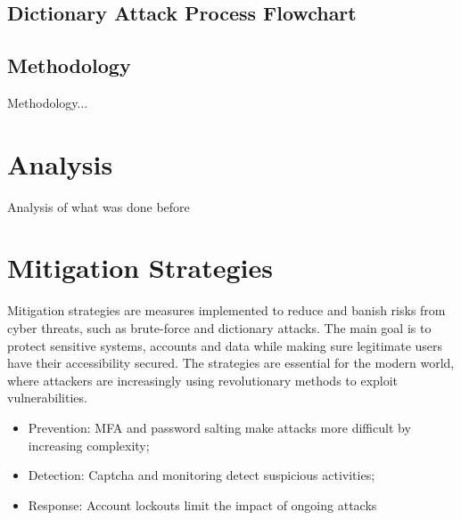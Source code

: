 \documentclass{comjnl}
\begin{document}
\subsection{Dictionary Attack Process Flowchart}


\subsection{Methodology}

Methodology...


\section{Analysis}

Analysis of what was done before

\section{Mitigation Strategies}
Mitigation strategies are measures implemented to reduce and banish risks from cyber threats, such as brute-force and dictionary attacks. The main goal is to protect sensitive systems, accounts and data while making sure legitimate users have their accessibility secured. The strategies are essential for the modern world, where attackers are increasingly using revolutionary methods to exploit vulnerabilities.


\begin{itemize}
  \item Prevention: MFA and password salting make attacks more difficult by increasing complexity;
  \item Detection: Captcha and monitoring detect suspicious activities;
  \item Response: Account lockouts limit the impact of ongoing attacks
\end{itemize}
\end{document}
